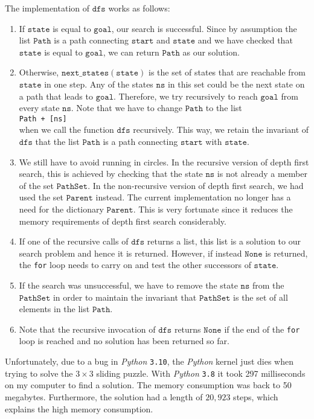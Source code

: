 The implementation of $\texttt{dfs}$ works as follows:
\begin{enumerate}
\item If $\texttt{state}$ is equal to $\texttt{goal}$, our search is successful. Since by assumption
      the list $\texttt{Path}$ is a path connecting $\texttt{start}$ and $\texttt{state}$ and we
      have checked that $\texttt{state}$ is equal to $\texttt{goal}$, we can return $\texttt{Path}$ as our solution.
\item Otherwise, $\texttt{next\_states}(\mathtt{state})$ is the set of states that are reachable from $\texttt{state}$
      in one step.  Any of the states $\texttt{ns}$ in this set could be the next state on a path
      that leads to $\texttt{goal}$.  Therefore, we try recursively to reach $\texttt{goal}$ from
      every state $\texttt{ns}$.  Note that we have to change $\texttt{Path}$ to the list
      \\[0.2cm]
      \hspace*{1.3cm}
      \texttt{Path + [ns]}
      \\[0.2cm]
      when we call the function $\texttt{dfs}$ recursively.  This way, we retain the invariant of
      $\texttt{dfs}$ that the list $\texttt{Path}$ is a path connecting $\texttt{start}$ with $\texttt{state}$.
\item We still have to avoid running in circles.  In the recursive version of depth first search,
      this is achieved by checking that the state $\texttt{ns}$ is not already a member of the set $\texttt{PathSet}$.  In the
      non-recursive version of depth first search, we had used the set $\texttt{Parent}$ instead.
      The current implementation no longer has a need for the dictionary $\texttt{Parent}$.  This is very
      fortunate since it reduces the memory requirements of depth first search considerably.
\item If one of the recursive calls of $\texttt{dfs}$ returns a list, this list is a solution to our
      search problem and hence it is returned.  However, if instead 
      $\texttt{None}$ is returned, the \texttt{for} loop needs to carry on and test the other
      successors of $\texttt{state}$.
\item If the search was unsuccessful, we have to remove the state $\texttt{ns}$ from the $\texttt{PathSet}$
      in order to maintain the invariant that $\texttt{PathSet}$ is the set of all elements in the list
      $\texttt{Path}$.
\item Note that the recursive invocation of $\texttt{dfs}$ returns $\mathtt{None}$ if the end of the
      \texttt{for} loop is reached and no solution has been returned so far.  
\end{enumerate}
Unfortunately, due to a bug in \textsl{Python} \texttt{3.10}, the \textsl{Python} kernel just dies
when trying to solve the $3 \times 3$ sliding puzzle.  With \textsl{Python} \texttt{3.8} it took 297 milliseconds 
on my computer to find a solution.  The memory consumption was back to 50 megabytes.  Furthermore, the
solution had a length of $20,923$ steps, which explains the high memory consumption.  

